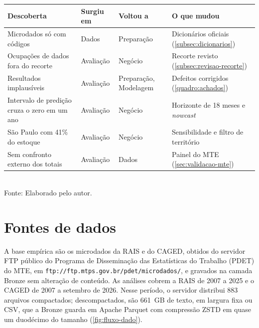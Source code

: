 \begin{quadro}[htbp]
    \centering
    \caption{Principais retornos no ciclo CRISP-DM}
    \label{quadro:crispdm-retornos}
    \footnotesize
    \renewcommand{\arraystretch}{1.25}
    \begin{tabularx}{\textwidth}{%
        >{\raggedright\arraybackslash\hsize=1.25\hsize}X
        >{\raggedright\arraybackslash\hsize=0.55\hsize}X
        >{\raggedright\arraybackslash\hsize=0.55\hsize}X
        >{\raggedright\arraybackslash\hsize=1.65\hsize}X}
        \toprule
        \rowcolor{black!8}
        \textbf{Descoberta} & \textbf{Surgiu em} & \textbf{Voltou a} & \textbf{O que mudou} \\
        \midrule
        Microdados só com códigos & Dados & Preparação & Dicionários oficiais (\autoref{subsec:dicionarios}) \\ \addlinespace[4pt]
        Ocupações de dados fora do recorte & Avaliação & Negócio & Recorte revisto (\autoref{subsec:revisao-recorte}) \\ \addlinespace[4pt]
        Resultados implausíveis & Avaliação & Preparação, Modelagem & Defeitos corrigidos (\autoref{quadro:achados}) \\ \addlinespace[4pt]
        Intervalo de predição cruza o zero em um ano & Avaliação & Negócio & Horizonte de 18 meses e \textit{nowcast} \\ \addlinespace[4pt]
        São Paulo com 41\% do estoque & Avaliação & Negócio & Sensibilidade e filtro de território \\ \addlinespace[4pt]
        Sem confronto externo dos totais & Avaliação & Dados & Painel do MTE (\autoref{sec:validacao-mte}) \\
        \bottomrule
    \end{tabularx}
    \\[4pt]
    {\footnotesize Fonte: Elaborado pelo autor.}
\end{quadro}

\section{Fontes de dados}

A base empírica são os microdados da RAIS e do CAGED, obtidos do servidor FTP público do Programa de Disseminação das Estatísticas do Trabalho (PDET) do MTE, em \nolinkurl{ftp://ftp.mtps.gov.br/pdet/microdados/}, e gravados na camada Bronze sem alteração de conteúdo. As análises cobrem a RAIS de 2007 a 2025 e o CAGED de 2007 a setembro de 2026. Nesse período, o servidor distribui 883 arquivos compactados; descompactados, são 661~GB de texto, em largura fixa ou CSV, que a Bronze guarda em Apache Parquet com compressão ZSTD em quase um duodécimo do tamanho (\autoref{fig:fluxo-dado}).

